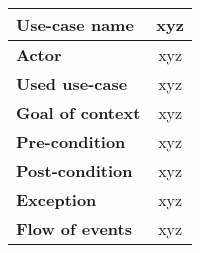 
\begin{tabular}{| l | c |}
	\hline \textbf{Use-case name} & xyz \\
	\hline \textbf{Actor} & xyz \\
	\hline \textbf{Used use-case} & xyz \\
	\hline \textbf{Goal of context} & xyz \\
	\hline \textbf{Pre-condition} & xyz \\
	\hline \textbf{Post-condition} & xyz \\
	\hline \textbf{Exception} & xyz \\
	\hline \textbf{Flow of events} & xyz \\
	\hline
\end{tabular}
